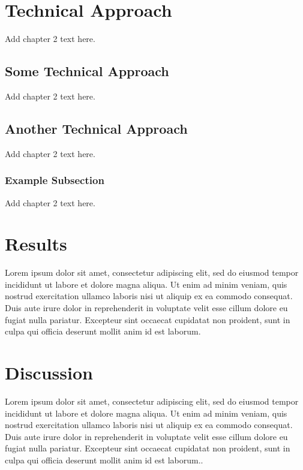 \documentclass[12pt]{report}   %
\begin{document}

\chapter{Technical Approach}
Add chapter 2 text here. 

\section{Some Technical Approach}

Add chapter 2 text here. 


\section{Another Technical Approach}

Add chapter 2 text here. 


\subsection{Example Subsection}

Add chapter 2 text here. 






\chapter{Results}
Lorem ipsum dolor sit amet, consectetur adipiscing elit, sed do eiusmod tempor incididunt ut labore et dolore magna aliqua. Ut enim ad minim veniam, quis nostrud exercitation ullamco laboris nisi ut aliquip ex ea commodo consequat. Duis aute irure dolor in reprehenderit in voluptate velit esse cillum dolore eu fugiat nulla pariatur. Excepteur sint occaecat cupidatat non proident, sunt in culpa qui officia deserunt mollit anim id est laborum.


\chapter{Discussion}
Lorem ipsum dolor sit amet, consectetur adipiscing elit, sed do eiusmod tempor incididunt ut labore et dolore magna aliqua. Ut enim ad minim veniam, quis nostrud exercitation ullamco laboris nisi ut aliquip ex ea commodo consequat. Duis aute irure dolor in reprehenderit in voluptate velit esse cillum dolore eu fugiat nulla pariatur. Excepteur sint occaecat cupidatat non proident, sunt in culpa qui officia deserunt mollit anim id est laborum..
\end{document}
